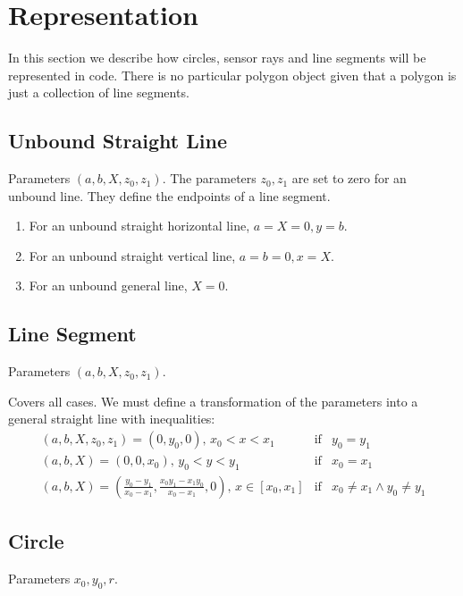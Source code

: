 \documentclass[11pt]{article}
\begin{document}
\section{Representation}
\label{sec-representation}
In this section we describe how circles, sensor rays and line segments will be
represented in code. There is no particular polygon object given that a
polygon is just a collection of line segments.

\subsection*{Unbound Straight Line}

Parameters $(a, b, X, z_0, z_1)$. 
The parameters $z_0, z_1$ are set to zero for an unbound line. They define
the endpoints of a line segment.

\begin{enumerate}
    \item For an unbound straight horizontal line, $a=X=0, y=b$.
    \item For an unbound straight vertical line, $a=b=0, x=X$.
    \item For an unbound general line, $X=0$.
\end{enumerate}

\subsection*{Line Segment}

Parameters $(a, b, X, z_0, z_1)$. 

Covers all cases. We must define a transformation of the parameters into a
general straight line with inequalities:
\begin{eqnarray*}
    (a, b, X, z_0, z_1) = (0, y_0, 0) ,\, x_0 < x < x_1 &\text{if}& 
        y_0 = y_1\\
    (a, b, X) = (0, 0, x_0) ,\, y_0 < y < y_1 &\text{if}& 
        x_0 = x_1\\
    (a, b, X) = \left(\frac{y_0 - y_1}{x_0-x_1},
            \frac{x_0 y_1 - x_1 y_0}{x_0 - x_1}, 0\right),\,
    x\in[x_0, x_1] &\text{if}& x_0\neq x_1 \land y_0\neq y_1
\end{eqnarray*}

\subsection*{Circle}

Parameters $x_0, y_0, r$.
\end{document}
